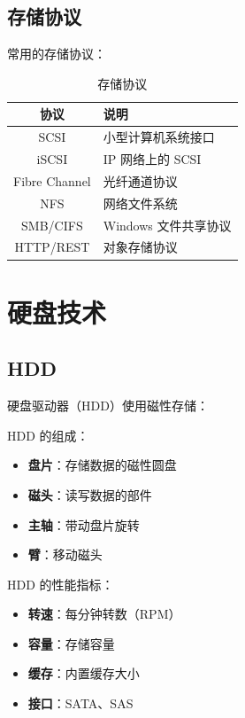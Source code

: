 \documentclass[12pt,UTF8]{ctexbook}
\begin{document}
\section{存储协议}
\label{sec:storage_protocols}

常用的存储协议：
\begin{table}[htbp]
    \centering
    \caption{存储协议}
    \begin{tabular}{|c|p{8cm}|}
        \hline
        \textbf{协议} & \textbf{说明} \\
        \hline
        SCSI & 小型计算机系统接口 \\
        \hline
        iSCSI & IP 网络上的 SCSI \\
        \hline
        Fibre Channel & 光纤通道协议 \\
        \hline
        NFS & 网络文件系统 \\
        \hline
        SMB/CIFS & Windows 文件共享协议 \\
        \hline
        HTTP/REST & 对象存储协议 \\
        \hline
    \end{tabular}
\end{table}

\chapter{硬盘技术}
\label{chap:hard_disk}

\section{HDD}
\label{sec:hdd}

硬盘驱动器（HDD）使用磁性存储：

HDD 的组成：
\begin{itemize}
    \item \textbf{盘片}：存储数据的磁性圆盘
    \item \textbf{磁头}：读写数据的部件
    \item \textbf{主轴}：带动盘片旋转
    \item \textbf{臂}：移动磁头
\end{itemize}

HDD 的性能指标：
\begin{itemize}
    \item \textbf{转速}：每分钟转数（RPM）
    \item \textbf{容量}：存储容量
    \item \textbf{缓存}：内置缓存大小
    \item \textbf{接口}：SATA、SAS
\end{itemize}
\end{document}
